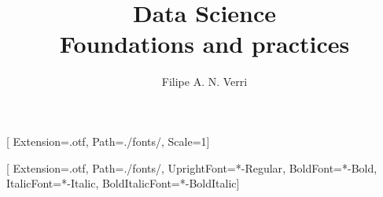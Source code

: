 \documentclass[twoside,a5paper]{book}
\begin{document}
[
  Extension={.otf},
  Path={./fonts/},
  Scale=1]

\setmainfont{STIXTwoText}[
  Extension={.otf},
  Path={./fonts/},
  UprightFont={*-Regular},
  BoldFont={*-Bold},
  ItalicFont={*-Italic},
  BoldItalicFont={*-BoldItalic}]

\title{Data Science \\ \large Foundations and practices}
\author{Filipe A. N. Verri}

\maketitle








\printbibliography
\end{document}
